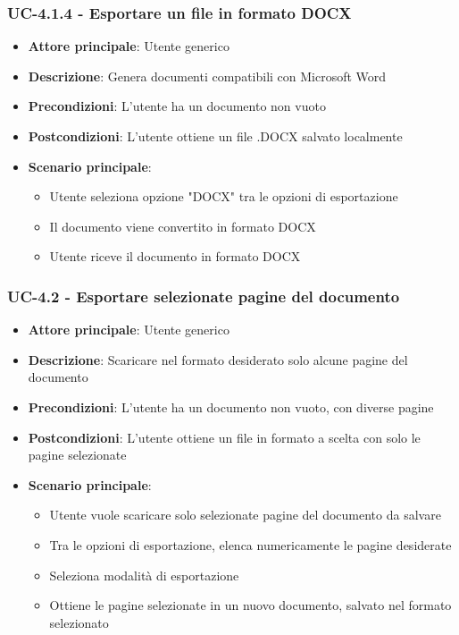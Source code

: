 \documentclass[11pt,a4paper]{article}
\begin{document}
\subsubsection{UC-4.1.4 - Esportare un file in formato DOCX}
\begin{itemize}
    \item \textbf{Attore principale}: Utente generico
    \item \textbf{Descrizione}: Genera documenti compatibili con Microsoft Word
    \item \textbf{Precondizioni}: L'utente ha un documento non vuoto
    \item \textbf{Postcondizioni}: L'utente ottiene un file .DOCX salvato localmente
    \item \textbf{Scenario principale}:
        \begin{itemize}
            \item Utente seleziona opzione "DOCX" tra le opzioni di esportazione
            \item Il documento viene convertito in formato DOCX
            \item Utente riceve il documento in formato DOCX
        \end{itemize}
\end{itemize}

\subsubsection{UC-4.2 - Esportare selezionate pagine del documento}
\begin{itemize}
    \item \textbf{Attore principale}: Utente generico
    \item \textbf{Descrizione}: Scaricare nel formato desiderato solo alcune pagine del documento
    \item \textbf{Precondizioni}: L'utente ha un documento non vuoto, con diverse pagine
    \item \textbf{Postcondizioni}: L'utente ottiene un file in formato a scelta con solo le pagine selezionate
    \item \textbf{Scenario principale}:
        \begin{itemize}
            \item Utente vuole scaricare solo selezionate pagine del documento da salvare
            \item Tra le opzioni di esportazione, elenca numericamente le pagine desiderate
            \item Seleziona modalità di esportazione
            \item Ottiene le pagine selezionate in un nuovo documento, salvato nel formato selezionato
        \end{itemize}
\end{itemize}
\end{document}
